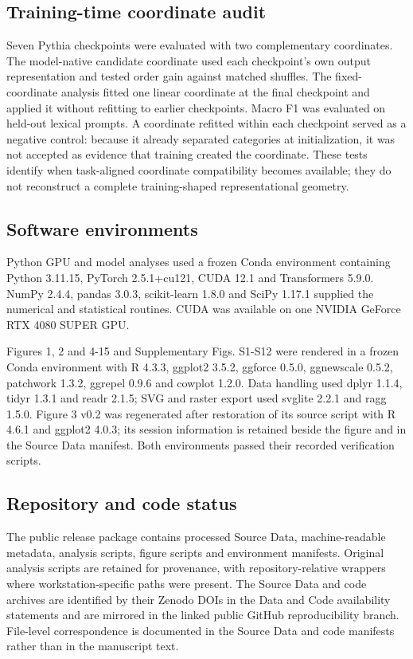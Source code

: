 \documentclass[11pt]{article}
\begin{document}
\subsection*{Training-time coordinate audit}
Seven Pythia checkpoints were evaluated with two complementary coordinates. The model-native candidate coordinate used each checkpoint's own output representation and tested order gain against matched shuffles. The fixed-coordinate analysis fitted one linear coordinate at the final checkpoint and applied it without refitting to earlier checkpoints. Macro F1 was evaluated on held-out lexical prompts. A coordinate refitted within each checkpoint served as a negative control: because it already separated categories at initialization, it was not accepted as evidence that training created the coordinate. These tests identify when task-aligned coordinate compatibility becomes available; they do not reconstruct a complete training-shaped representational geometry.

\subsection*{Software environments}
Python GPU and model analyses used a frozen Conda environment containing Python 3.11.15, PyTorch 2.5.1+cu121, CUDA 12.1 and Transformers 5.9.0. NumPy 2.4.4, pandas 3.0.3, scikit-learn 1.8.0 and SciPy 1.17.1 supplied the numerical and statistical routines. CUDA was available on one NVIDIA GeForce RTX 4080 SUPER GPU.

Figures 1, 2 and 4-15 and Supplementary Figs. S1-S12 were rendered in a frozen Conda environment with R 4.3.3, ggplot2 3.5.2, ggforce 0.5.0, ggnewscale 0.5.2, patchwork 1.3.2, ggrepel 0.9.6 and cowplot 1.2.0. Data handling used dplyr 1.1.4, tidyr 1.3.1 and readr 2.1.5; SVG and raster export used svglite 2.2.1 and ragg 1.5.0. Figure 3 v0.2 was regenerated after restoration of its source script with R 4.6.1 and ggplot2 4.0.3; its session information is retained beside the figure and in the Source Data manifest. Both environments passed their recorded verification scripts.

\subsection*{Repository and code status}
The public release package contains processed Source Data, machine-readable metadata, analysis scripts, figure scripts and environment manifests. Original analysis scripts are retained for provenance, with repository-relative wrappers where workstation-specific paths were present. The Source Data and code archives are identified by their Zenodo DOIs in the Data and Code availability statements and are mirrored in the linked public GitHub reproducibility branch. File-level correspondence is documented in the Source Data and code manifests rather than in the manuscript text.
\end{document}
